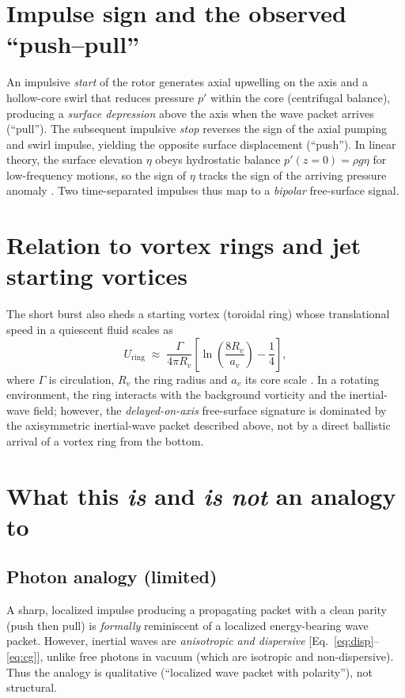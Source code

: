 \documentclass[12pt]{article}
\begin{document}
\section{Impulse sign and the observed ``push--pull''}
An impulsive \emph{start} of the rotor generates axial upwelling on the axis and a hollow-core swirl that reduces pressure $p'$ within the core (centrifugal balance), producing a \emph{surface depression} above the axis when the wave packet arrives (``pull''). The subsequent impulsive \emph{stop} reverses the sign of the axial pumping and swirl impulse, yielding the opposite surface displacement (``push''). In linear theory, the surface elevation $\eta$ obeys hydrostatic balance $p'(z=0)=\rho g \eta$ for low-frequency motions, so the sign of $\eta$ tracks the sign of the arriving pressure anomaly \cite{Batchelor1967,Vallis2017}. Two time-separated impulses thus map to a \emph{bipolar} free-surface signal.

\section{Relation to vortex rings and jet starting vortices}
The short burst also sheds a starting vortex (toroidal ring) whose translational speed in a quiescent fluid scales as
\begin{equation}
U_{\mathrm{ring}}\;\approx\; \frac{\Gamma}{4\pi R_v}\left[\ln\!\left(\frac{8 R_v}{a_v}\right)-\frac{1}{4}\right],
\label{eq:ring}
\end{equation}
where $\Gamma$ is circulation, $R_v$ the ring radius and $a_v$ its core scale \cite{Saffman1992}. In a rotating environment, the ring interacts with the background vorticity and the inertial-wave field; however, the \emph{delayed-on-axis} free-surface signature is dominated by the axisymmetric inertial-wave packet described above, not by a direct ballistic arrival of a vortex ring from the bottom.

\section{What this \emph{is} and \emph{is not} an analogy to}
\subsection*{Photon analogy (limited)}
A sharp, localized impulse producing a propagating packet with a clean parity (push then pull) is \emph{formally} reminiscent of a localized energy-bearing wave packet. However, inertial waves are \emph{anisotropic and dispersive} [Eq.~\eqref{eq:disp}--\eqref{eq:cg}], unlike free photons in vacuum (which are isotropic and non-dispersive). Thus the analogy is qualitative (``localized wave packet with polarity''), not structural.
\end{document}

